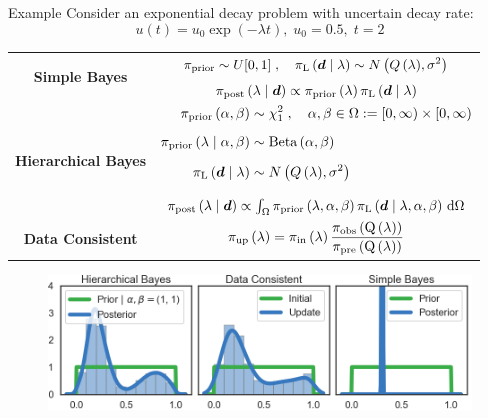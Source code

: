 \begin{block}{Example}
\centering
Consider an exponential decay problem with uncertain decay rate:
\begin{equation*}
       u(t) = u_0\exp(-\lambda t), \; u_0 = 0.5 ,\; t=2
   \end{equation*}

\begin{tabular}{c|c}
\hline
\multirow{2}{*}{\vspace{1.5ex}\textbf{Simple Bayes}} & 
$\begin{aligned}\prior \sim U[0,1]\; , \quad  \likelihood\qGivelam\sim N\left(Q\lam,\sigma^2\right) \end{aligned}$ \\[1.25ex]
                                        & $\bayes$ \\
\hline
\multirow{2}{*}{\vspace{2ex} \textbf{Hierarchical Bayes}}   & $\begin{aligned}
        \prior\hyper &\sim \chi^2_1\; , \quad \alpha,\beta\in\Omega:=[0,\infty)\times[0,\infty) \\[1.25ex]
        \prior\lamGiveH &\sim \text{Beta}\hyper \\[1.25ex]
        \likelihood\qGivelam &\sim N\left(Q\lam,\sigma^2\right)\\[1.25ex] \end{aligned}$ \\[1.25ex]
                                    & $\Hbayes$ \\
\hline
\textbf{Data Consistent} &  $\dci$ \\
\hline
\end{tabular}
\vspace{1cm}
\begin{figure}
        \includegraphics[width=32cm]{figures/distr_EX_lambda_space.png}

\end{figure}
\end{block}
